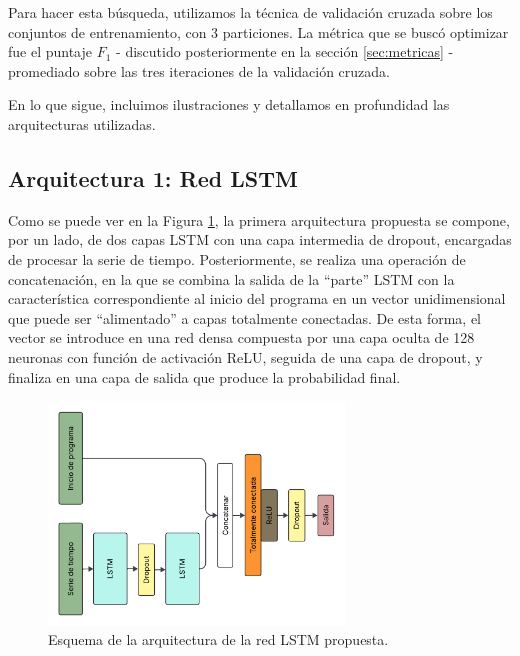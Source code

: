 \documentclass[../../main.tex]{subfiles}
\begin{document}
Para hacer esta búsqueda, utilizamos la técnica de validación cruzada sobre los conjuntos
de entrenamiento, con 3 particiones. La métrica que se buscó optimizar fue el puntaje
\(F_1\) - discutido posteriormente en la sección \ref{sec:metricas} - promediado sobre las
tres iteraciones de la validación cruzada.

En lo que sigue, incluimos ilustraciones y detallamos en profundidad las arquitecturas
utilizadas.

\subsection{Arquitectura 1: Red LSTM}
Como se puede ver en la Figura \ref{fig:lstm_v2}, la primera arquitectura propuesta se
compone, por un lado, de dos capas LSTM con una capa intermedia de dropout, encargadas de
procesar la serie de tiempo. Posteriormente, se realiza una operación de concatenación, en
la que se combina la salida de la ``parte'' LSTM con la característica correspondiente al
inicio del programa en un vector unidimensional que puede ser ``alimentado'' a capas
totalmente conectadas. De esta forma, el vector se introduce en una red densa compuesta
por una capa oculta de 128 neuronas con función de activación ReLU, seguida de una capa de
dropout, y finaliza en una capa de salida que produce la probabilidad final.
\begin{figure}[h]
    \centering
    \includegraphics[width=0.7\textwidth]{figs/lstm_v2.png}
    \caption{Esquema de la arquitectura de la red LSTM propuesta.}
    \label{fig:lstm_v2}
\end{figure}
\end{document}
